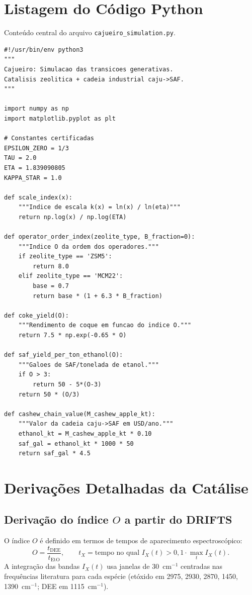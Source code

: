\documentclass[12pt,a4paper,twoside]{book}
\theoremstyle{plain}
\theoremstyle{definition}
\theoremstyle{definition}
\begin{document}
\chapter{Listagem do Código Python}
\label{ap:python-codigo}

Conteúdo central do arquivo \texttt{cajueiro\_simulation.py}.

\begin{lstlisting}[basicstyle=\ttfamily\footnotesize]
#!/usr/bin/env python3
"""
Cajueiro: Simulacao das transicoes generativas.
Catalisis zeolitica + cadeia industrial caju->SAF.
"""

import numpy as np
import matplotlib.pyplot as plt

# Constantes certificadas
EPSILON_ZERO = 1/3
TAU = 2.0
ETA = 1.839090805
KAPPA_STAR = 1.0

def scale_index(x):
    """Indice de escala k(x) = ln(x) / ln(eta)"""
    return np.log(x) / np.log(ETA)

def operator_order_index(zeolite_type, B_fraction=0):
    """Indice O da ordem dos operadores."""
    if zeolite_type == 'ZSM5':
        return 8.0
    elif zeolite_type == 'MCM22':
        base = 0.7
        return base * (1 + 6.3 * B_fraction)

def coke_yield(O):
    """Rendimento de coque em funcao do indice O."""
    return 7.5 * np.exp(-0.65 * O)

def saf_yield_per_ton_ethanol(O):
    """Galoes de SAF/tonelada de etanol."""
    if O > 3:
        return 50 - 5*(O-3)
    return 50 * (O/3)

def cashew_chain_value(M_cashew_apple_kt):
    """Valor da cadeia caju->SAF em USD/ano."""
    ethanol_kt = M_cashew_apple_kt * 0.10
    saf_gal = ethanol_kt * 1000 * 50
    return saf_gal * 4.5
\end{lstlisting}

\chapter{Derivações Detalhadas da Catálise}
\label{ap:cat-derivacoes}

\section{Derivação do índice $O$ a partir do DRIFTS}

O índice $O$ é definido em termos de tempos de aparecimento espectroscópico:
\[
  O = \frac{t_{\text{DEE}}}{t_{\text{EtO}}}, \qquad t_{X} = \text{tempo no qual } I_{X}(t) > 0{,}1 \cdot \max_{t} I_{X}(t).
\]
A integração das bandas $I_{X}(t)$ usa janelas de 30~cm$^{-1}$ centradas
nas frequências literatura para cada espécie (etóxido em 2975, 2930,
2870, 1450, 1390~cm$^{-1}$; DEE em 1115~cm$^{-1}$).
\end{document}

